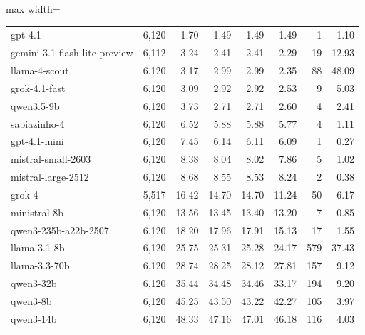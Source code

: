 \begin{table}[htbp]
\begin{adjustbox}{max width=\linewidth}
\begin{tabular}{lrrrrrrr}
gpt-4.1 & 6{,}120 & 1.70 & 1.49 & 1.49 & 1.49 & 1 & 1.10 \\
gemini-3.1-flash-lite-preview & 6{,}112 & 3.24 & 2.41 & 2.41 & 2.29 & 19 & 12.93 \\
llama-4-scout & 6{,}120 & 3.17 & 2.99 & 2.99 & 2.35 & 88 & 48.09 \\
grok-4.1-fast & 6{,}120 & 3.09 & 2.92 & 2.92 & 2.53 & 9 & 5.03 \\
qwen3.5-9b & 6{,}120 & 3.73 & 2.71 & 2.71 & 2.60 & 4 & 2.41 \\
sabiazinho-4 & 6{,}120 & 6.52 & 5.88 & 5.88 & 5.77 & 4 & 1.11 \\
gpt-4.1-mini & 6{,}120 & 7.45 & 6.14 & 6.11 & 6.09 & 1 & 0.27 \\
mistral-small-2603 & 6{,}120 & 8.38 & 8.04 & 8.02 & 7.86 & 5 & 1.02 \\
mistral-large-2512 & 6{,}120 & 8.68 & 8.55 & 8.53 & 8.24 & 2 & 0.38 \\
grok-4 & 5{,}517 & 16.42 & 14.70 & 14.70 & 11.24 & 50 & 6.17 \\
ministral-8b & 6{,}120 & 13.56 & 13.45 & 13.40 & 13.20 & 7 & 0.85 \\
qwen3-235b-a22b-2507 & 6{,}120 & 18.20 & 17.96 & 17.91 & 15.13 & 17 & 1.55 \\
llama-3.1-8b & 6{,}120 & 25.75 & 25.31 & 25.28 & 24.17 & 579 & 37.43 \\
llama-3.3-70b & 6{,}120 & 28.74 & 28.25 & 28.12 & 27.81 & 157 & 9.12 \\
qwen3-32b & 6{,}120 & 35.44 & 34.48 & 34.46 & 33.17 & 194 & 9.20 \\
qwen3-8b & 6{,}120 & 45.25 & 43.50 & 43.22 & 42.27 & 105 & 3.97 \\
qwen3-14b & 6{,}120 & 48.33 & 47.16 & 47.01 & 46.18 & 116 & 4.03 \\
\bottomrule
\end{tabular}
\end{adjustbox}
\end{table}

